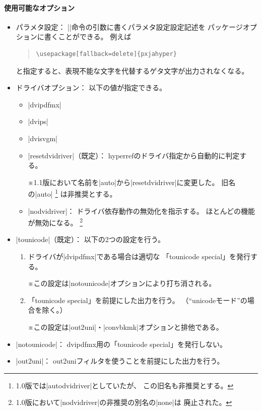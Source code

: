 \documentclass[uplatex,dvipdfmx,a4paper]{jsarticle}
\renewcommand{\headfont}{\gtfamily\romanseries{sbc}\sffamily}
\newcommand{\Pkg}[1]{\textsf{#1}}
\newcommand{\Note}{\par\noindent ※}
\newcommand{\Means}{：\quad}
\newcommand{\／}{\mbox{}／\mbox{}}
\providecommand{\Strong}[1]{{\headfont#1}}
\begin{document}
\paragraph{使用可能なオプション}\mbox{}
\begin{itemize}
\item \Strong{パラメタ設定}\Means
  |\pxjahypersetup|命令の引数に書くパラメタ設定設定記述を
  パッケージオプションに書くことができる。
  例えば
\begin{quote}\small\begin{verbatim}
\usepackage[fallback=delete]{pxjahyper}
\end{verbatim}\end{quote}
  と指定すると、表現不能な文字を代替するゲタ文字が出力されなくなる。
\item \Strong{ドライバオプション}\Means
  以下の値が指定できる。
  \begin{itemize}
  \item |dvipdfmx|
  \item |dvips|
  \item |dvisvgm|
  \item |resetdvidriver|（既定）\Means
    \Pkg{hyperref}のドライバ指定から自動的に判定する。
    \Note 1.1版において名前を|auto|から|resetdvidriver|に変更した。
      旧名の|auto|%
      \footnote{1.0版では|autodvidriver|としていたが、
        この旧名も\Strong{非推奨}とする。}%
      は\Strong{非推奨}とする。
  \item |nodvidriver|\Means
    ドライバ依存動作の無効化を指示する。
    ほとんどの機能が無効になる。
    \footnote{1.0版において|nodvidriver|の非推奨の別名の|none|は
      \Strong{廃止}された。}
  \end{itemize}
\item |tounicode|（既定）\Means
  以下の2つの設定を行う。
  \begin{enumerate}
  \item ドライバが|dvipdfmx|である場合は適切な
    「tounicode special」を発行する。
    \Note この設定は|notounicode|オプションにより打ち消される。
  \item 「tounicode special」を前提にした出力を行う。
    （“unicodeモード”の場合を除く。）
    \Note この設定は|out2uni|・|convbkmk|オプションと排他である。
  \end{enumerate}
\item |notounicode|\Means
  dvipdfmx用の「tounicode special」を発行しない。
\item |out2uni|\Means
  out2uniフィルタを使うことを前提にした出力を行う。

\end{itemize}
\end{document}
